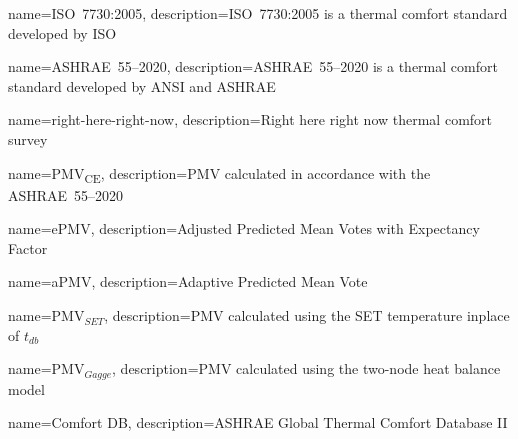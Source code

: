 \usepackage[nonumberlist,nogroupskip]{glossaries}


{
name={ISO~7730:2005},
description={ISO~7730:2005 is a thermal comfort standard developed by ISO}
}

{
name={ASHRAE~55--2020},
description={ASHRAE~55--2020 is a thermal comfort standard developed by ANSI and ASHRAE}
}

{
name={right-here-right-now},
description={Right here right now thermal comfort survey}
}

{
name={PMV\textsubscript{CE}},
description={PMV calculated in accordance with the ASHRAE~55--2020}
}

{
name={ePMV},
description={Adjusted Predicted Mean Votes with Expectancy Factor}
}

{
name={aPMV},
description={Adaptive Predicted Mean Vote}
}

{
name={PMV$_{SET}$},
description={PMV calculated using the SET temperature inplace of $t_{db}$}
}

{
name={PMV$_{Gagge}$},
description={PMV calculated using the two-node heat balance model}
}

{
name={Comfort DB},
description={ASHRAE Global Thermal Comfort Database II}
}

\makenoidxglossaries